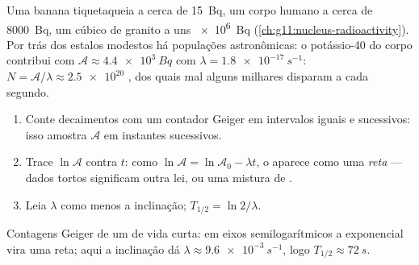 \begin{example}\label{ex:g12:radioactive-decay:body}
Uma banana tiquetaqueia a cerca de \qty{15}{Bq}, um corpo humano a cerca de
\qty{8000}{Bq}, um  cúbico de granito a uns \qty{e6}{Bq}
(\cref{ch:g11:nucleus-radioactivity}). Por trás dos estalos modestos há populações
astronômicas: o potássio-40 do corpo contribui com
$\mathcal A \approx \qty{4.4e3}{Bq}$ com $\lambda = \qty{1.8e-17}{s^{-1}}$:
$N = \mathcal A/\lambda \approx \num{2.5e20}$ , dos quais mal alguns milhares
disparam a cada segundo.
\end{example}

\begin{method}\label{met:g12:radioactive-decay:semilog}
\begin{enumerate}
  \item Conte decaimentos com um contador Geiger em intervalos iguais e sucessivos: isso
        amostra $\mathcal A$ em instantes sucessivos.
  \item Trace $\ln \mathcal A$ contra $t$: como
        $\ln \mathcal A = \ln \mathcal A_0 - \lambda t$, o  aparece
        como uma \emph{reta} --- dados tortos significam outra lei, ou uma mistura de
        .
  \item Leia $\lambda$ como menos a inclinação; $T_{1/2} = \ln 2/\lambda$.
\end{enumerate}
\end{method}

\begin{omfigure}

{\small Contagens Geiger de um  de vida curta: em eixos semilogarítmicos a
exponencial vira uma reta; aqui a inclinação dá
$\lambda \approx \qty{9.6e-3}{s^{-1}}$, logo $T_{1/2} \approx \qty{72}{s}$.}
\end{omfigure}

